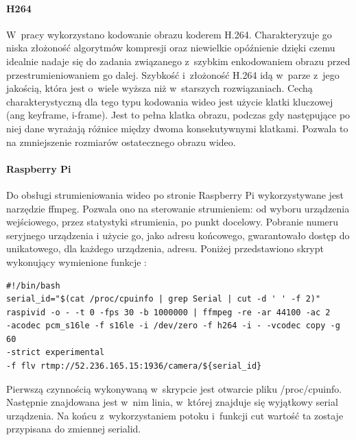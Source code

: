 \paragraph{H264}
W~pracy wykorzystano kodowanie obrazu koderem H.264. Charakteryzuje go niska złożoność algorytmów kompresji oraz niewielkie opóźnienie dzięki czemu idealnie nadaje się do zadania związanego z~szybkim enkodowaniem obrazu przed przestrumieniowaniem go dalej. \cite{H264}
Szybkość i~złożoność H.264 idą w~parze z~jego jakością, która jest o~wiele wyższa niż w~starszych rozwiązaniach.
Cechą charakterystyczną dla tego typu kodowania wideo jest użycie klatki kluczowej (ang keyframe, i-frame). Jest to pełna klatka obrazu, podczas gdy następujące po niej dane wyrażają różnice między dwoma konsekutywnymi klatkami. Pozwala to na zmniejszenie rozmiarów ostatecznego obrazu wideo.

\paragraph{Raspberry Pi}
Do obsługi strumieniowania wideo po stronie Raspberry Pi wykorzystywane jest narzędzie ffmpeg. Pozwala ono na sterowanie strumieniem: od wyboru urządzenia wejściowego, przez statystyki strumienia, po punkt docelowy. Pobranie numeru seryjnego urządzenia i użycie go, jako adresu końcowego, gwarantowało dostęp do unikatowego, dla każdego urządzenia, adresu. Poniżej przedstawiono skrypt wykonujący wymienione funkcje \cite{raspivid}:
\begin{verbatim}
#!/bin/bash
serial_id="$(cat /proc/cpuinfo | grep Serial | cut -d ' ' -f 2)"
raspivid -o - -t 0 -fps 30 -b 1000000 | ffmpeg -re -ar 44100 -ac 2 
-acodec pcm_s16le -f s16le -i /dev/zero -f h264 -i - -vcodec copy -g 60 
-strict experimental 
-f flv rtmp://52.236.165.15:1936/camera/${serial_id}
\end{verbatim}
Pierwszą czynnością wykonywaną w~skrypcie jest otwarcie pliku /proc/cpuinfo. Następnie znajdowana jest w~nim linia, w~której znajduje się wyjątkowy serial urządzenia. Na końcu z~wykorzystaniem potoku i~funkcji cut wartość ta zostaje przypisana do zmiennej serialid.

